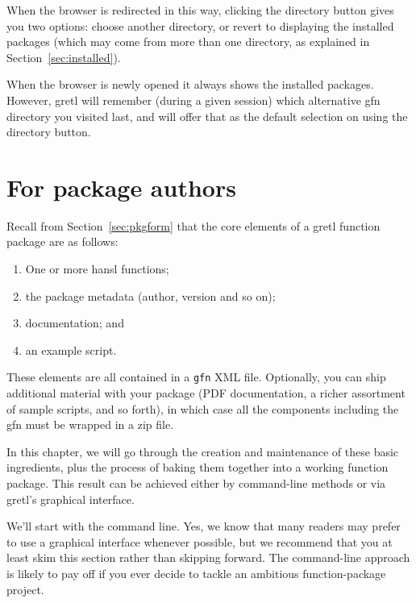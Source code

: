 \documentclass[oneside]{book}
\begin{document}
When the browser is redirected in this way, clicking the directory
button gives you two options: choose another directory, or revert to
displaying the installed packages (which may come from more than one
directory, as explained in Section~\ref{sec:installed}).

When the browser is newly opened it always shows the installed
packages. However, gretl will remember (during a given session) which
alternative \textsf{gfn} directory you visited last, and will offer
that as the default selection on using the directory button.



\chapter{For package authors}
\label{chap:authors}

Recall from Section~\ref{sec:pkgform} that the core elements
of a gretl function package are as follows:
\begin{enumerate}
\item One or more hansl functions;
\item the package metadata (author, version and so on);
\item documentation; and
\item an example script.
\end{enumerate}
These elements are all contained in a \texttt{gfn} XML file.
Optionally, you can ship additional material with your package (PDF
documentation, a richer assortment of sample scripts, and so forth),
in which case all the components including the \textsf{gfn} must be
wrapped in a zip file.

In this chapter, we will go through the creation and maintenance of
these basic ingredients, plus the process of baking them together into
a working function package. This result can be achieved either by
command-line methods or via gretl's graphical interface.

We'll start with the command line. Yes, we know that many readers may
prefer to use a graphical interface whenever possible, but we
recommend that you at least skim this section rather than skipping
forward.  The command-line approach is likely to pay off if you ever
decide to tackle an ambitious function-package project.
\end{document}

